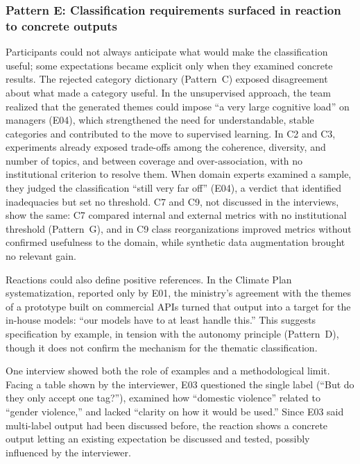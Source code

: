 \documentclass[sigconf,nonacm]{acmart}
\begin{document}

\subsubsection{Pattern E: Classification requirements surfaced in reaction to concrete outputs}
\label{sec:pe}

Participants could not always anticipate what would make the classification useful; some expectations became explicit only when they examined concrete results. The rejected category dictionary (Pattern~C) exposed disagreement about what made a category useful. In the unsupervised approach, the team realized that the generated themes could impose ``a very large cognitive load'' on managers (E04), which strengthened the need for understandable, stable categories and contributed to the move to supervised learning. In C2 and C3, experiments already exposed trade-offs among the coherence, diversity, and number of topics, and between coverage and over-association, with no institutional criterion to resolve them. When domain experts examined a sample, they judged the classification ``still very far off'' (E04), a verdict that identified inadequacies but set no threshold. C7 and C9, not discussed in the interviews, show the same: C7 compared internal and external metrics with no institutional threshold (Pattern~G), and in C9 class reorganizations improved metrics without confirmed usefulness to the domain, while synthetic data augmentation brought no relevant gain.

Reactions could also define positive references. In the Climate Plan systematization, reported only by E01, the ministry's agreement with the themes of a prototype built on commercial APIs turned that output into a target for the in-house models: ``our models have to at least handle this.'' This suggests specification by example, in tension with the autonomy principle (Pattern~D), though it does not confirm the mechanism for the thematic classification.

One interview showed both the role of examples and a methodological limit. Facing a table shown by the interviewer, E03 questioned the single label (``But do they only accept one tag?''), examined how ``domestic violence'' related to ``gender violence,'' and lacked ``clarity on how it would be used.'' Since E03 said multi-label output had been discussed before, the reaction shows a concrete output letting an existing expectation be discussed and tested, possibly influenced by the interviewer.
\end{document}

